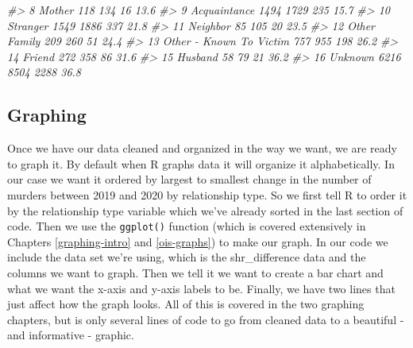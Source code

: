 \documentclass[
]{krantz}
\makeatletter
\newenvironment{Shaded}{\begin{snugshade}}{\end{snugshade}}
\newcommand{\CommentTok}[1]{\textcolor[rgb]{0.37,0.37,0.37}{\textit{#1}}}
\newenvironment{kframe}{%
\medskip{}
\setlength{\fboxsep}{.8em}
 \def\at@end@of@kframe{}%
 \ifinner\ifhmode%
  \def\at@end@of@kframe{\end{minipage}}%
  \begin{minipage}{\columnwidth}%
 \fi\fi%
 \def\FrameCommand##1{\hskip\@totalleftmargin \hskip-\fboxsep
 \colorbox{shadecolor}{##1}\hskip-\fboxsep
     \hskip-\linewidth \hskip-\@totalleftmargin \hskip\columnwidth}%
 \MakeFramed {\advance\hsize-\width
   \@totalleftmargin\z@ \linewidth\hsize
   \@setminipage}}%
 {\par\unskip\endMakeFramed%
 \at@end@of@kframe}
\renewenvironment{Shaded}{\begin{kframe}}{\end{kframe}}
\makeatother
\begin{document}
\begin{Shaded}
\begin{Highlighting}[]
\CommentTok{\#\textgreater{}  8 Mother                             118    134         16          13.6 }
\CommentTok{\#\textgreater{}  9 Acquaintance                      1494   1729        235          15.7 }
\CommentTok{\#\textgreater{} 10 Stranger                          1549   1886        337          21.8 }
\CommentTok{\#\textgreater{} 11 Neighbor                            85    105         20          23.5 }
\CommentTok{\#\textgreater{} 12 Other Family                       209    260         51          24.4 }
\CommentTok{\#\textgreater{} 13 Other {-} Known To Victim            757    955        198          26.2 }
\CommentTok{\#\textgreater{} 14 Friend                             272    358         86          31.6 }
\CommentTok{\#\textgreater{} 15 Husband                             58     79         21          36.2 }
\CommentTok{\#\textgreater{} 16 Unknown                           6216   8504       2288          36.8}
\end{Highlighting}
\end{Shaded}

\hypertarget{graphing}{%
\subsection{Graphing}\label{graphing}}

Once we have our data cleaned and organized in the way we want, we are ready to graph it. By default when R graphs data it will organize it alphabetically. In our case we want it ordered by largest to smallest change in the number of murders between 2019 and 2020 by relationship type. So we first tell R to order it by the relationship type variable which we've already sorted in the last section of code. Then we use the \texttt{ggplot()} function (which is covered extensively in Chapters \ref{graphing-intro} and \ref{ois-graphs}) to make our graph. In our code we include the data set we're using, which is the shr\_difference data and the columns we want to graph. Then we tell it we want to create a bar chart and what we want the x-axis and y-axis labels to be. Finally, we have two lines that just affect how the graph looks. All of this is covered in the two graphing chapters, but is only several lines of code to go from cleaned data to a beautiful - and informative - graphic.
\end{document}
